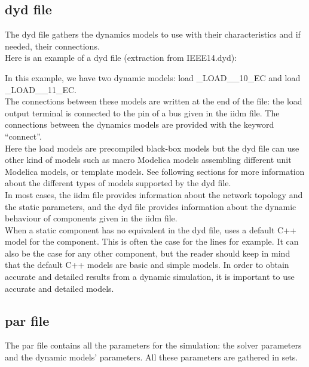 \documentclass[a4paper, 12pt]{report}
\begin{document}
\subsection{dyd file}

The dyd file gathers the dynamics models to use with their characteristics and if needed, their connections. \\

Here is an example of a dyd file (extraction from IEEE14.dyd):


In this example, we have two dynamic models: load \_LOAD\_\_10\_EC and load \_LOAD\_\_11\_EC. \\

The connections between these models are written at the end of the file: the load output terminal is connected to the pin of a bus given in the iidm file. The connections between the dynamics models are provided with the keyword ``connect''. \\

Here the load models are precompiled black-box models but the dyd file can use other kind of models such as macro Modelica models assembling different unit Modelica models, or template models. See following sections for more information about the different types of models supported by the dyd file. \\

In most cases, the iidm file provides information about the network topology and the static parameters, and the dyd file provides information about the dynamic behaviour of components given in the iidm file. \\

When a static component has no equivalent in the dyd file, \Dynawo uses a default C++ model for the component. This is often the case for the lines for example. It can also be the case for any other component, but the reader should keep in mind that the default C++ models are basic and simple models. In order to obtain accurate and detailed results from a dynamic simulation, it is important to use accurate and detailed models.

\subsection{par file}

The par file contains all the parameters for the simulation: the solver parameters and the dynamic models' parameters. All these parameters are gathered in sets. \\
\end{document}
